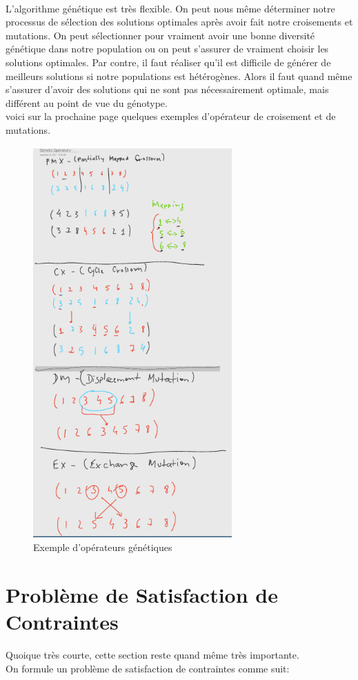 \documentclass[oneside]{book}
\begin{document}
\paragraph{}
L'algorithme génétique est très flexible. On peut nous même déterminer notre processus de sélection des solutions optimales après avoir fait notre croisements et mutations. On peut sélectionner pour vraiment avoir une bonne diversité génétique dans notre population ou on peut s'assurer de vraiment choisir les solutions optimales. Par contre, il faut réaliser qu'il est difficile de générer de meilleurs solutions si notre populations est hétérogènes. Alors il faut quand même s'assurer d'avoir des solutions qui ne sont pas nécessairement optimale, mais différent au point de vue du génotype.\\

voici sur la prochaine page quelques exemples d'opérateur de croisement et de mutations.
\begin{figure}[h!t]
\centering
\includegraphics[height = 15cm, keepaspectratio]{operateur_genetique.png}
\caption{Exemple d'opérateurs génétiques}
\label{fig:ops_genetique}
\end{figure}
\section{Problème de Satisfaction de Contraintes}
\noindent Quoique très courte, cette section reste quand même très importante. \\
On formule un problème de satisfaction de contraintes comme suit:\\
\end{document}
